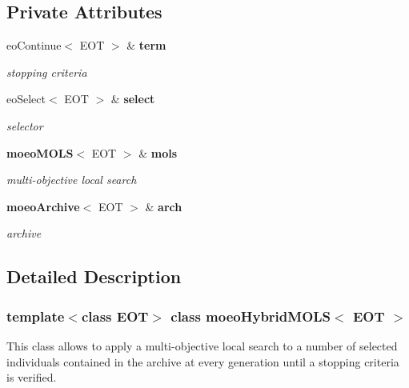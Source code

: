 \subsection*{Private Attributes}
\begin{CompactItemize}
\item 
eo\-Continue$<$ EOT $>$ \& {\bf term}\label{classmoeoHybridMOLS_cd05dc1c82febb819945663c3b5c6a75}

\begin{CompactList}\small\item\em stopping criteria \item\end{CompactList}\item 
eo\-Select$<$ EOT $>$ \& {\bf select}\label{classmoeoHybridMOLS_b47c4d1bce77c5648b437a5884a7c41f}

\begin{CompactList}\small\item\em selector \item\end{CompactList}\item 
{\bf moeo\-MOLS}$<$ EOT $>$ \& {\bf mols}\label{classmoeoHybridMOLS_5ecf318c321a71857c11da1ff5000092}

\begin{CompactList}\small\item\em multi-objective local search \item\end{CompactList}\item 
{\bf moeo\-Archive}$<$ EOT $>$ \& {\bf arch}\label{classmoeoHybridMOLS_4aecb1f300f2f09b8d45998cc140576b}

\begin{CompactList}\small\item\em archive \item\end{CompactList}\end{CompactItemize}


\subsection{Detailed Description}
\subsubsection*{template$<$class EOT$>$ class moeo\-Hybrid\-MOLS$<$ EOT $>$}

This class allows to apply a multi-objective local search to a number of selected individuals contained in the archive at every generation until a stopping criteria is verified. 



